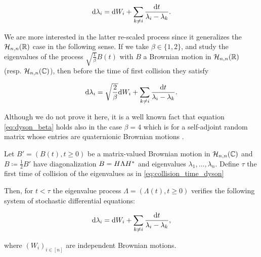 \begin{equation*}
        \mathrm d \lambda_i = \mathrm d W_i + \sum_{k\neq i} \frac{\mathrm d t}{\lambda_i - \lambda_k}.
\end{equation*}

We are more interested in the latter re-scaled process since it generalizes the $\mathcal H_{n,n}(\mathbb R)$ case in the following sense. If we take $\beta \in \{1,2\}$, and study the eigenvalues of the process $\sqrt{\frac{1}{\beta}}B(t)$ with $B$ a Brownian motion in $\mathcal H_{n,n}(\mathbb R)$ (resp. $\mathcal H_{n,n}(\mathbb C)$), then before the time of first collision they satisfy

\begin{equation}
        \mathrm d \lambda_i = \sqrt{\frac{2}{\beta}}\mathrm d W_i + \sum_{k\neq i} \frac{\mathrm d t}{\lambda_i - \lambda_k}. \label{eq:dyson_beta}
\end{equation}

Although we do not prove it here, it is a well known fact that equation \eqref{eq:dyson_beta} holds also in the case $\beta = 4$ which is for a self-adjoint random matrix whose entries are quaternionic Brownian motions \cite{article:dyson}.

\begin{theorem} \label{thm:dyson_complejo}
    Let $B' = (B(t), t \ge 0)$ be a matrix-valued Brownian motion in $\mathcal H_{n,n}(\mathbb C)$ and $B\coloneqq \frac{1}{2}B'$ have diagonalization $B = H \Lambda H^*$ and eigenvalues $\lambda_1, \dots, \lambda_n$. Define $\tau$ the first time of collision of the eigenvalues as in \eqref{eq:collision_time_dyson}

    Then, for $t < \tau$ the eigenvalue process $\Lambda = (\Lambda(t), t\ge 0)$ verifies the following system of stochastic differential equations:

    \begin{equation}
        \mathrm d \lambda_i = \mathrm d W_i + \sum_{k\neq i} \frac{\mathrm d t}{\lambda_i - \lambda_k},
    \end{equation}

    \noindent where $(W_i)_{i\in[n]}$ are independent Brownian motions.
\end{theorem}


